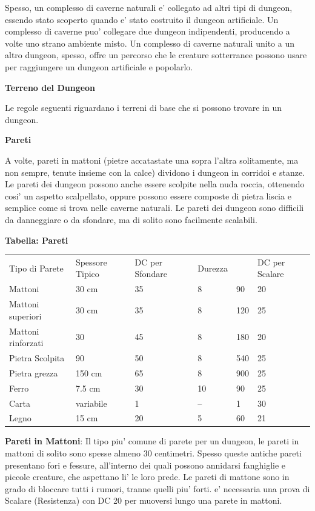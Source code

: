 \documentclass[a4paper,11pt,twoside,openany]{dndbook}
\begin{document}
{Spesso, un complesso di caverne naturali e' collegato ad altri tipi di dungeon, essendo stato scoperto quando e' stato costruito il dungeon artificiale. Un complesso di caverne puo' collegare due dungeon indipendenti, producendo a volte uno strano ambiente misto. Un complesso di caverne naturali unito a un altro dungeon, spesso, offre un percorso che le creature sotterranee possono usare per raggiungere un dungeon artificiale e popolarlo.

\textbf{Terreno del Dungeon}

Le regole seguenti riguardano i terreni di base che si possono trovare in un dungeon.

\textbf{Pareti}

A volte, pareti in mattoni (pietre accatastate una sopra l'altra solitamente, ma non sempre, tenute insieme con la calce) dividono i dungeon in corridoi e stanze. Le pareti dei dungeon possono anche essere scolpite nella nuda roccia, ottenendo cosi' un aspetto scalpellato, oppure possono essere composte di pietra liscia e semplice come si trova nelle caverne naturali. Le pareti dei dungeon sono difficili da danneggiare o da sfondare, ma di solito sono facilmente scalabili.

\bigskip

\textbf{Tabella: Pareti}

\begin{tabular}{@{}llllll@{}}
\toprule 
Tipo di Parete & Spessore Tipico & DC per Sfondare & Durezza & & DC per Scalare\tabularnewline
Mattoni & 30 cm & 35 & 8 & 90 & 20\tabularnewline
Mattoni superiori & 30 cm & 35 & 8 & 120 & 25\tabularnewline
Mattoni rinforzati & 30 & 45 & 8 & 180 & 20\tabularnewline
Pietra Scolpita & 90 & 50 & 8 & 540 & 25\tabularnewline
Pietra grezza & 150 cm & 65 & 8 & 900 & 25\tabularnewline
Ferro & 7.5 cm & 30 & 10 & 90 & 25\tabularnewline
Carta & variabile & 1 & -- & 1 & 30\tabularnewline
Legno & 15 cm & 20 & 5 & 60 & 21\tabularnewline
\bottomrule
\end{tabular}

\bigskip
 
\textbf{Pareti in Mattoni}: Il tipo piu' comune di parete per un dungeon, le pareti in mattoni di solito sono spesse almeno 30 centimetri. Spesso queste antiche pareti presentano fori e fessure, all'interno dei quali possono annidarsi fanghiglie e piccole creature, che aspettano li' le loro prede. Le pareti di mattone sono in grado di bloccare tutti i rumori, tranne quelli piu' forti. e' necessaria una prova di Scalare (Resistenza) con DC 20 per muoversi lungo una parete in mattoni.

}
\end{document}
